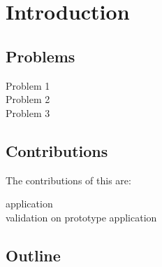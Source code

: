 
\chapter{Introduction}
\minitoc



\section{Problems}
\begin{description}
	\item[Problem 1]
	\item[Problem 2]
	\item[Problem 3]
\end{description}
\section{Contributions}
The contributions of this are:

\begin{description}
	\item[\B]
	\item[\B application \FFI]
	\item[\B validation on prototype application]
\end{description}


\section{Outline}


\\

